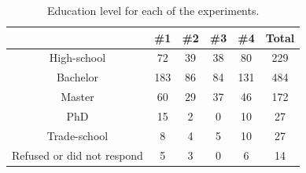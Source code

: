 \documentclass[letterpaper]{article} %
\begin{document}
\begin{table}
\centering
\begin{tabular}{ c|c c c c c }
\hline
 & \#1 & \#2 & \#3 & \#4 & Total\\
 \hline
High-school & 72 & 39 & 38 & 80 & 229\\
Bachelor & 183 & 86 & 84 & 131 & 484\\
Master & 60 & 29 & 37 & 46 & 172\\
PhD & 15 & 2 & 0 & 10 & 27\\
Trade-school & 8 & 4 & 5 & 10 & 27\\
Refused or did not respond & 5 & 3 & 0 & 6 & 14\\
 \hline
\end{tabular}
\caption{Education level for each of the experiments.}
\label{tbl:education}
\end{table}





\end{document}
